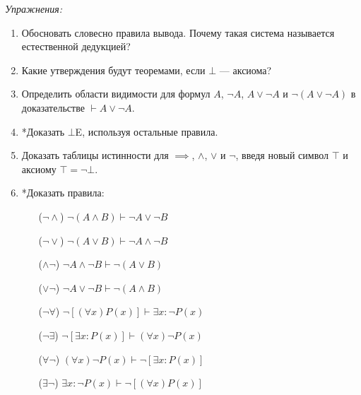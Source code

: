 {\it Упражнения:}
\begin{enumerate}
	\item{}Обосновать словесно правила вывода. Почему такая система называется
	естественной дедукцией?
	\item{}Какие утверждения будут теоремами, если $\bot$ --- аксиома?
	\item{}Определить области видимости для формул $A$, $\lnot A$, $A\lor\lnot A$
	и $\lnot(A\lor\lnot A)$ в доказательстве $\vdash A\lor\lnot A$.
	\item{}*Доказать $\bot$E, используя остальные правила.
	\item{}Доказать таблицы истинности для $\implies$, $\land$, $\lor$ и $\lnot$,
	введя новый символ $\top$ и аксиому $\top=\lnot\bot$.
	\pagebreak
	\item{}*Доказать правила:
	\begin{multicols}{2}
		\begin{enumerate}
			\item[($\lnot\land$)]{}$\lnot(A\land B)\vdash \lnot A\lor \lnot B$
			\item[($\lnot\lor$)]{}$\lnot(A\lor B)\vdash \lnot A\land \lnot B$
			\item[($\land\lnot$)]{}$\lnot A\land\lnot B\vdash \lnot(A\lor B)$
			\item[($\lor\lnot$)]{}$\lnot A\lor\lnot B\vdash \lnot(A\land B)$
			\item[($\lnot\forall$)]{}$\lnot[(\forall x)P(x)]\vdash\exists x:\lnot P(x)$
			\item[($\lnot\exists$)]{}$\lnot[\exists x:P(x)]\vdash (\forall x)\lnot P(x)$
			\item[($\forall\lnot$)]{}$(\forall x)\lnot P(x)\vdash \lnot[\exists x:P(x)]$
			\item[($\exists\lnot$)]{}$\exists x:\lnot P(x)\vdash \lnot[(\forall x)P(x)]$
		\end{enumerate}
	\end{multicols}
\end{enumerate}

